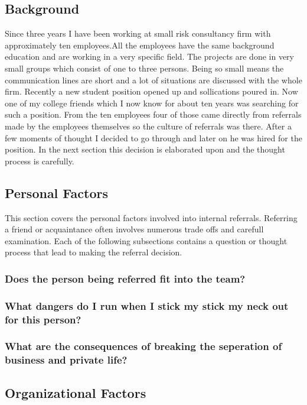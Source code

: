 \documentclass[a4paper, 11pt]{article} %
\begin{document}
\subsection*{Background}

 Since three years I have been working at small risk consultancy firm with approximately ten employees.All the employees have the same background education and are working in a very specific field. The projects are done in very small groups which consist of one to three persons. Being so small means the communication lines are short and a lot of situations are discussed with the whole firm. Recently a new student position opened up and sollications poured in.  Now one of my college friends which I now know for about ten years was searching for such a position. From the ten employees four of those came directly from referrals made by the employees themselves so the culture of referrals was there. After a few moments of thought I decided to go through and later on he was hired for the position. In the next section this decision is elaborated upon and the thought process is carefully. 

\subsection*{Personal Factors}

This section covers the personal factors involved into internal referrals. Referring a friend or acquaintance often involves numerous trade offs and carefull examination. Each of the following subsections contains a question or thought process that lead to making the referral decision.

\subsubsection*{Does the person being referred fit into the team?}
\subsubsection*{What dangers do I run when I stick my stick my neck out for this person?}
\subsubsection*{What are the consequences of breaking the seperation of business and private life?}

\subsection*{Organizational Factors}
\end{document}
